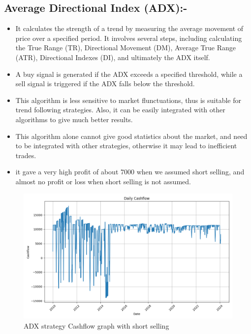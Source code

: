 \documentclass[11pt]{article}
\begin{document}
\subsection{Average Directional Index (ADX):-}
\begin{itemize}
    \item It calculates the strength of a trend by measuring the average movement of price over a specified period. It involves several steps, including calculating the True Range (TR), Directional Movement (DM), Average True Range (ATR), Directional Indexes (DI), and ultimately the ADX itself.
    \item A buy signal is generated if the ADX exceeds a specified threshold, while a sell signal is triggered if the ADX falls below the threshold.
    \item This algorithm is less sensitive to market flunctuations, thus is suitable for trend following strategies. Also, it can be easily integrated with other algorithms to give much better results.
    \item This algorithm alone cannot give good statistics about the market, and need to be integrated with other strategies, otherwise it may lead to inefficient trades.
    \item it gave a very high profit of about 7000 when we assumed short selling, and almost no profit or loss when short selling is not assumed.
\end{itemize}

\begin{figure}[H]
  \centering
  \includegraphics[width=1\textwidth]{ADX_with_short.png}
  \caption{ADX strategy Cashflow graph with short selling}
\end{figure}
\end{document}
